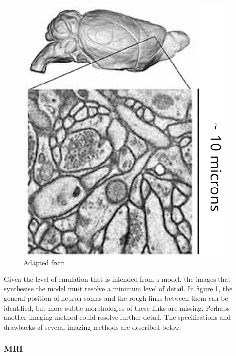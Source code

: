 \begin{figure}[h]
    \centering
    \includegraphics[scale=2]{figures/images/enlarge.jpg}
    {Adapted from \cite[fig. 1]{mikula_progress_2016}}
    \label{scaleexample}
\end{figure}
\vspace{1ex}

Given the level of emulation that is intended from a model, the images that
synthesise the model must resolve a minimum level of detail. In figure
\ref{scaleexample}, the general position of neuron somas 
and the rough links between them can be identified, but more subtle morphologies
of these links are missing. Perhaps another imaging method could resolve further
detail. The specifications and drawbacks of several imaging methods are
described below.

\subsubsection*{MRI}

